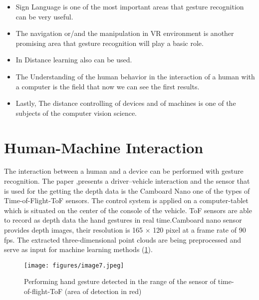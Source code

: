 \documentclass[12pt]{book}
\begin{document}
\begin{itemize}
    \item Sign Language is one of the most important areas that gesture recognition can be very useful.
    \item The navigation or/and the manipulation in VR environment is another promising area that gesture recognition will play a basic role. 
    \item In Distance learning also can be used.
    \item The Understanding of the human behavior in the interaction of a human with a computer is the field that now we can see the first results. 
    \item Lastly, The distance controlling of devices and of machines is one of the subjects of the computer vision science.
\end{itemize}

\section{Human-Machine Interaction}\label{s:sec13}
The interaction between a human and a device can be performed with gesture recognition. The paper \cite{ZEN2018},presents a driver–vehicle interaction and the sensor that is used for the getting the depth data is the Camboard Nano one of the types of Time-of-Flight-ToF sensors. The control system is applied on a computer-tablet which is situated on the center of the console of the vehicle. ToF sensors are able to record as depth data the hand gestures in real time.Camboard nano sensor provides depth images, their resolution is 165 × 120 pixel at a frame  rate of 90 fps. The extracted three-dimensional point clouds are being preprocessed and serve as input for machine learning methods (\ref{fig:fig7}).

\begin{figure}[!htbp]
\centering
  \texttt{[image: figures/image7.jpeg]}
  \\
  \caption{Performing hand gesture detected in the range of the sensor of time-of-flight-ToF (area of detection in red)\cite{ZEN2018}}
  \label{fig:fig7}
\end{figure}
\end{document}
